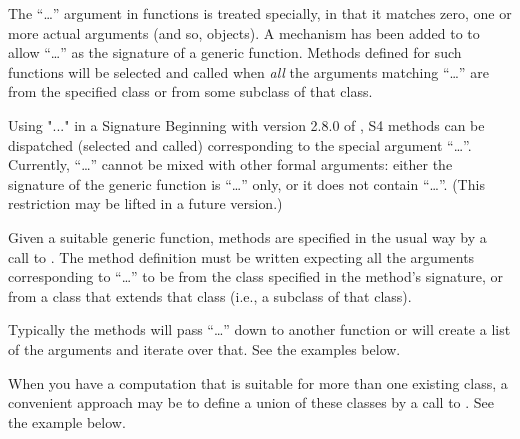 %
\begin{Description}\relax
The ``\dots'' argument in \R{} functions is treated specially, in that it
matches zero, one or more actual arguments (and so, objects).  A
mechanism has been added to \R{} to allow ``\dots'' as the signature of a
generic function.  Methods defined for such functions will be
selected and called when \emph{all}  the arguments matching ``\dots''
are from the specified class or from some subclass of that class.
\end{Description}
%
\begin{Section}{Using "..." in a Signature}
Beginning with version 2.8.0 of \R{}, S4 methods can be dispatched
(selected and called) corresponding to the special argument ``\dots''.
Currently, ``\dots'' cannot be mixed with other formal arguments:
either the signature of the generic function is ``\dots'' only, or it
does not contain ``\dots''.  (This restriction may be lifted in a future
version.)

Given a suitable generic function, methods are specified in the
usual way by a call to .  The method
definition must be written expecting all the arguments corresponding
to ``\dots'' to be from the class specified in the method's signature,
or from a class that extends that class (i.e., a subclass of that
class).

Typically the methods will pass ``\dots'' down to another function or
will create a list of the arguments and iterate over that.  See the
examples below.

When you have a computation that is suitable for more than one existing
class, a convenient approach may be to define a union of these
classes by a call to . See the example
below.

\end{Section}
%
